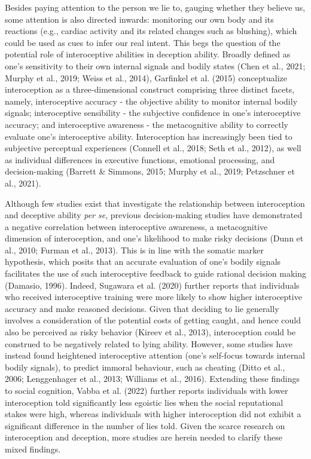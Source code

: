 \documentclass[
  man,mask,floatsintext]{apa6}
\begin{document}
Besides paying attention to the person we lie to, gauging whether they believe us, some attention is also directed inwards: monitoring our own body and its reactions (e.g., cardiac activity and its related changes such as blushing), which could be used as cues to infer our real intent. This begs the question of the potential role of interoceptive abilities in deception ability. Broadly defined as one's sensitivity to their own internal signals and bodily states (Chen et al., 2021; Murphy et al., 2019; Weiss et al., 2014), Garfinkel et al. (2015) conceptualize interoception as a three-dimensional construct comprising three distinct facets, namely, interoceptive accuracy - the objective ability to monitor internal bodily signals; interoceptive sensibility - the subjective confidence in one's interoceptive accuracy; and interoceptive awareness - the metacognitive ability to correctly evaluate one's interoceptive ability. Interoception has increasingly been tied to subjective perceptual experiences (Connell et al., 2018; Seth et al., 2012), as well as individual differences in executive functions, emotional processing, and decision-making (Barrett \& Simmons, 2015; Murphy et al., 2019; Petzschner et al., 2021).

Although few studies exist that investigate the relationship between interoception and deceptive ability \emph{per se}, previous decision-making studies have demonstrated a negative correlation between interoceptive awareness, a metacognitive dimension of interoception, and one's likelihood to make risky decisions (Dunn et al., 2010; Furman et al., 2013). This is in line with the somatic marker hypothesis, which posits that an accurate evaluation of one's bodily signals facilitates the use of such interoceptive feedback to guide rational decision making (Damasio, 1996). Indeed, Sugawara et al. (2020) further reports that individuals who received interoceptive training were more likely to show higher interoceptive accuracy and make reasoned decisions. Given that deciding to lie generally involves a consideration of the potential costs of getting caught, and hence could also be perceived as risky behavior (Kireev et al., 2013), interoception could be construed to be negatively related to lying ability. However, some studies have instead found heightened interoceptive attention (one's self-focus towards internal bodily signals), to predict immoral behaviour, such as cheating (Ditto et al., 2006; Lenggenhager et al., 2013; Williams et al., 2016). Extending these findings to social cognition, Vabba et al. (2022) further reports individuals with lower interoception told significantly less egoistic lies when the social reputational stakes were high, whereas individuals with higher interoception did not exhibit a significant difference in the number of lies told. Given the scarce research on interoception and deception, more studies are herein needed to clarify these mixed findings.
\end{document}
